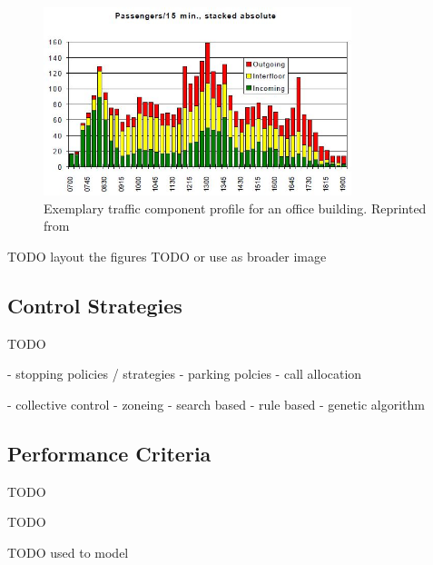 \begin{figure}[hbt]
	\centering
	\includegraphics[width=0.8\textwidth, keepaspectratio]{resources/traffictimes}
	\caption{\label{fig:sota:traffictimes} Exemplary traffic component profile for an office building.
	Reprinted from \textcite[][p.~14]{siikonen1997models}}
\end{figure}

TODO layout the figures
TODO or use \textcite[][p.~12]{sorsa2005destination} as broader image 

\subsection{Control Strategies}
TODO

\autocite[][pp.~3--4,10]{beers2015arrivals}
- stopping policies / strategies
- parking polcies
- call allocation

\autocite[][pp.~3--6]{axelsson2013strategies}
- collective control
- zoneing
- search based
- rule based
- genetic algorithm




\subsection{Performance Criteria}

TODO

TODO
\autocite[][p.~10]{beers2015arrivals}
\autocite[][p.~7]{hakonen2003simulation}
\autocite[][pp.8-9]{siikonen1997models}
\autocite[][p.~194]{unger2015aufzuege}

TODO used to model

